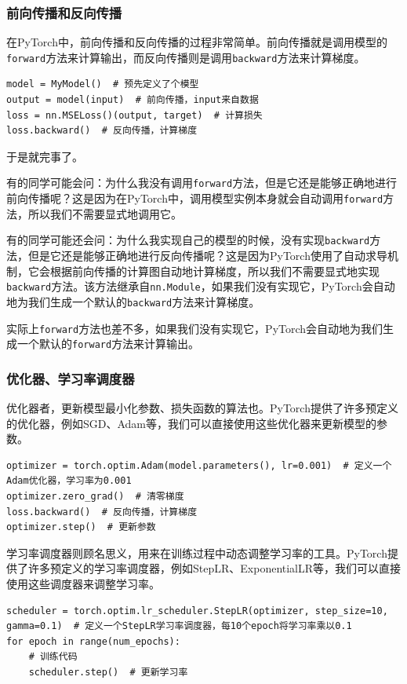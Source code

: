 \documentclass[fontset=none]{ctexart}
\begin{document}
\subsubsection{前向传播和反向传播}

在PyTorch中，前向传播和反向传播的过程非常简单。前向传播就是调用模型的\texttt{forward}方法来计算输出，而反向传播则是调用\texttt{backward}方法来计算梯度。
\begin{verbatim}
model = MyModel()  # 预先定义了个模型
output = model(input)  # 前向传播，input来自数据
loss = nn.MSELoss()(output, target)  # 计算损失
loss.backward()  # 反向传播，计算梯度
\end{verbatim}
于是就完事了。

有的同学可能会问：为什么我没有调用\texttt{forward}方法，但是它还是能够正确地进行前向传播呢？这是因为在PyTorch中，调用模型实例本身就会自动调用\texttt{forward}方法，所以我们不需要显式地调用它。

有的同学可能还会问：为什么我实现自己的模型的时候，没有实现\texttt{backward}方法，但是它还是能够正确地进行反向传播呢？这是因为PyTorch使用了自动求导机制，它会根据前向传播的计算图自动地计算梯度，所以我们不需要显式地实现\texttt{backward}方法。该方法继承自\texttt{nn.Module}，如果我们没有实现它，PyTorch会自动地为我们生成一个默认的\texttt{backward}方法来计算梯度。

实际上\texttt{forward}方法也差不多，如果我们没有实现它，PyTorch会自动地为我们生成一个默认的\texttt{forward}方法来计算输出。

\subsubsection{优化器、学习率调度器}

优化器者，更新模型最小化参数、损失函数的算法也。PyTorch提供了许多预定义的优化器，例如SGD、Adam等，我们可以直接使用这些优化器来更新模型的参数。
\begin{verbatim}
optimizer = torch.optim.Adam(model.parameters(), lr=0.001)  # 定义一个Adam优化器，学习率为0.001
optimizer.zero_grad()  # 清零梯度
loss.backward()  # 反向传播，计算梯度
optimizer.step()  # 更新参数
\end{verbatim}

学习率调度器则顾名思义，用来在训练过程中动态调整学习率的工具。PyTorch提供了许多预定义的学习率调度器，例如StepLR、ExponentialLR等，我们可以直接使用这些调度器来调整学习率。
\begin{verbatim}
scheduler = torch.optim.lr_scheduler.StepLR(optimizer, step_size=10, gamma=0.1)  # 定义一个StepLR学习率调度器，每10个epoch将学习率乘以0.1
for epoch in range(num_epochs):
    # 训练代码
    scheduler.step()  # 更新学习率
\end{verbatim}
\end{document}
